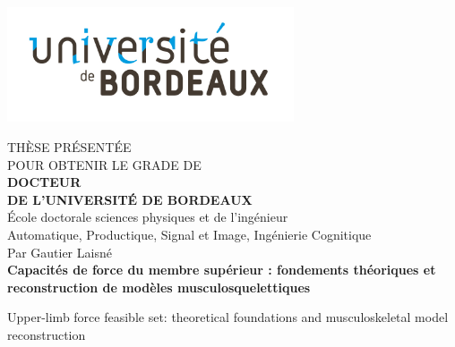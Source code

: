 
\begin{titlepage}

    \centering\includegraphics[scale=1, height=3.4cm]{img/page_de_garde/Universite Bordeaux RVB-01.png}
    \hfill
    
    \begin{center}
    
    \doublespacing
    
    THÈSE PRÉSENTÉE\\ POUR OBTENIR LE GRADE DE \\
    {\LARGE \textbf{DOCTEUR\\DE L'UNIVERSITÉ DE BORDEAUX} } \\
    \vspace{0.55cm}
    École doctorale sciences physiques et de l'ingénieur\\
    {\normalsize Automatique, Productique, Signal et Image, Ingénierie Cognitique} \\
    \vspace{0.55cm}
    Par {\large Gautier Laisné} \\
    \vspace{0.55cm}
    {\Large \textbf{Capacités de force du membre supérieur : fondements théoriques et reconstruction de modèles musculosquelettiques}}
    
    {\small Upper-limb force feasible set: theoretical foundations and musculoskeletal model reconstruction}


\end{center}
\end{titlepage}
